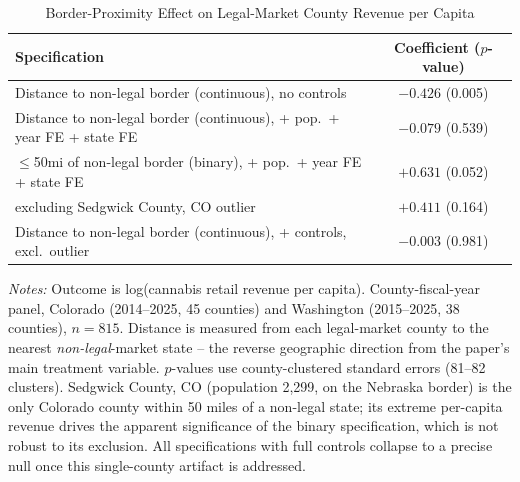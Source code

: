 \begin{table}[htbp]
\centering
\caption{Border-Proximity Effect on Legal-Market County Revenue per Capita}
\label{tab:supplyside_check}
\begin{tabular}{lc}
\toprule
Specification & Coefficient ($p$-value) \\
\midrule
Distance to non-legal border (continuous), no controls & $-0.426$ (0.005) \\
Distance to non-legal border (continuous), + pop.\ + year FE + state FE & $-0.079$ (0.539) \\
$\leq$50mi of non-legal border (binary), + pop.\ + year FE + state FE & $+0.631$ (0.052) \\
\quad excluding Sedgwick County, CO outlier & $+0.411$ (0.164) \\
Distance to non-legal border (continuous), + controls, excl.\ outlier & $-0.003$ (0.981) \\
\bottomrule
\end{tabular}
\begin{minipage}{0.95\textwidth}
\vspace{0.3em}
\footnotesize
\textit{Notes:} Outcome is log(cannabis retail revenue per capita). County-fiscal-year panel, Colorado
(2014--2025, 45 counties) and Washington (2015--2025, 38 counties), $n=815$. Distance is measured from each
legal-market county to the nearest \emph{non-legal}-market state -- the reverse geographic direction from the
paper's main treatment variable. $p$-values use county-clustered standard errors (81--82 clusters). Sedgwick
County, CO (population 2{,}299, on the Nebraska border) is the only Colorado county within 50 miles of a
non-legal state; its extreme per-capita revenue drives the apparent significance of the binary specification,
which is not robust to its exclusion. All specifications with full controls collapse to a precise null once
this single-county artifact is addressed.
\end{minipage}
\end{table}
